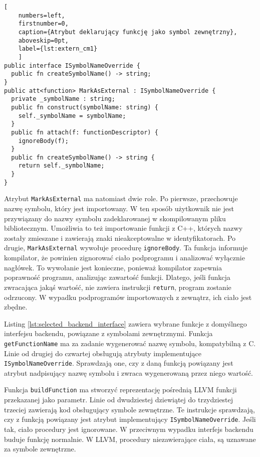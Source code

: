 \begin{minipage}{\linewidth}
  
  \begin{lstlisting}[
    numbers=left,
    firstnumber=0,
    caption={Atrybut deklarujący funkcję jako symbol zewnętrzny},
    aboveskip=0pt,
    label={lst:extern_cm1}
    ]
public interface ISymbolNameOverride {
  public fn createSymbolName() -> string;
}
public att<function> MarkAsExternal : ISymbolNameOverride {
  private _symbolName : string;
  public fn construct(symbolName: string) {
    self._symbolName = symbolName;
  }
  public fn attach(f: functionDescriptor) {
    ignoreBody(f);
  }
  public fn createSymbolName() -> string {
    return self._symbolName;
  }
}
\end{lstlisting}
\end{minipage}



Atrybut \lstinline{MarkAsExternal} ma natomiast dwie role.
Po pierwsze, przechowuje nazwę symbolu, który jest importowany.
W ten sposób użytkownik nie jest przywiązany do nazwy symbolu zadeklarowanej w skompilowanym pliku bibliotecznym.
Umożliwia to też importowanie funkcji z C++, których nazwy zostały zmieszane i zawierają znaki nieakceptowalne w identyfikatorach.
Po drugie, \lstinline{MarkAsExternal} wywołuje procedurę \lstinline{ignoreBody}.
Ta funkcja informuje kompilator, że powinien zignorować ciało podprogramu i analizować wyłącznie nagłówek.
To wywołanie jest konieczne, ponieważ kompilator zapewnia poprawność programu, analizując zawartość funkcji.
Dlatego, jeśli funkcja zwracająca jakąś wartość, nie zawiera instrukcji \lstinline{return}, program zostanie odrzucony.
W wypadku podprogramów importowanych z zewnątrz, ich ciało jest zbędne.

Listing \ref{lst:selected_backend_interface} zawiera wybrane funkcje z domyślnego interfejsu backendu, powiązane z symbolami zewnętrznymi.
Funkcja \lstinline{getFunctionName} ma za zadanie wygenerować nazwę symbolu, kompatybilną z C.
Linie od drugiej do czwartej obsługują atrybuty implementujące \lstinline{ISymbolNameOverride}.
Sprawdzają one, czy z daną funkcją powiązany jest atrybut nadpisujący nazwę symbolu i zwraca wygenerowaną przez niego wartość.

Funkcja \lstinline{buildFunction} ma stworzyć reprezentację pośrednią LLVM funkcji przekazanej jako parametr.
Linie od dwudziestej dziewiątej do trzydziestej trzeciej zawierają kod obsługujący symbole zewnętrzne.
Te instrukcje sprawdzają, czy z funkcją powiązany jest atrybut implementujący \lstinline{ISymbolNameOverride}.
Jeśli tak, ciało procedury jest ignorowane.
W przeciwnym wypadku interfejs backendu buduje funkcję normalnie.
W LLVM, procedury niezawierające ciała, są uznawane za symbole zewnętrzne.

